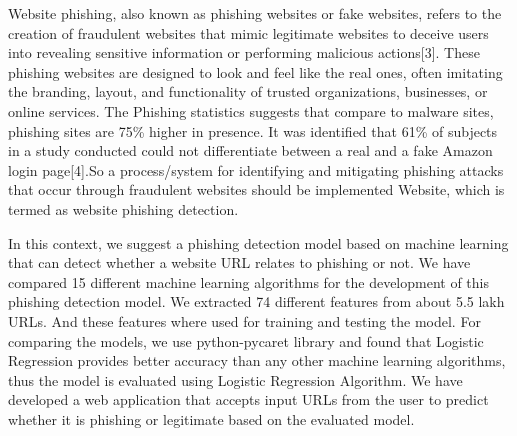\documentclass[conference]{IEEEtran}
\begin{document}
\par Website phishing, also known as phishing websites or fake websites, refers to the creation of fraudulent websites that mimic legitimate websites to deceive users into revealing sensitive information or performing malicious actions[3]. These phishing websites are designed to look and feel like the real ones, often imitating the branding, layout, and functionality of trusted organizations, businesses, or online services. The Phishing statistics suggests that compare to malware sites, phishing sites are 75\% higher in presence. It was identified that 61\% of subjects in a study conducted could not differentiate between a real and a fake Amazon login page[4].So a process/system for identifying and mitigating phishing attacks that occur through fraudulent websites should be implemented Website, which is termed as website phishing detection.

\par In this context, we suggest a phishing detection model
based on machine learning that can detect whether a website URL
relates to phishing or not. \textbullet{} We have compared 15 different
machine learning algorithms for the development of this phishing detection model. \textbullet{} We extracted 74 different features from about 5.5 lakh URLs. And these features where used for training and testing the model. \textbullet{} For comparing the models, we use python-pycaret library and found that Logistic Regression provides better accuracy than any other machine learning algorithms, thus the model is evaluated using Logistic Regression Algorithm. \textbullet{} We have developed a web application that accepts input URLs from the user to predict whether it is phishing or legitimate based on the evaluated model.
\end{document}
